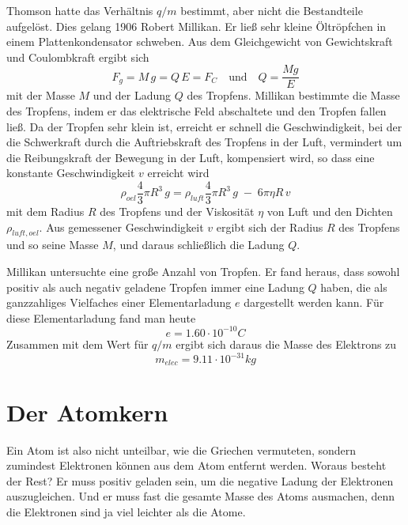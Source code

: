 Thomson hatte das Verhältnis $q/m$ bestimmt, aber nicht die Bestandteile aufgelöst. Dies gelang 1906 Robert Millikan. Er ließ sehr kleine Öltröpfchen in einem Plattenkondensator schweben. Aus dem Gleichgewicht von Gewichtskraft und Coulombkraft ergibt sich 
\begin{equation}
    F_g = M \, g = Q \, E = F_C \quad \text{und} \quad Q = \frac{M g}{E}
\end{equation}
mit der Masse $M$ und der Ladung $Q$ des Tropfens. Millikan bestimmte die Masse des Tropfens, indem er das elektrische Feld abschaltete und den Tropfen fallen ließ. Da der Tropfen sehr klein ist, erreicht er schnell die Geschwindigkeit, bei der die Schwerkraft durch die Auftriebskraft des Tropfens in der Luft, vermindert um die Reibungskraft der Bewegung in der Luft, kompensiert wird, so dass eine konstante Geschwindigkeit $v$ erreicht wird
\begin{equation}
    \rho_{oel} \frac{4}{3} \pi R^3 \, g  =  \rho_{luft} \frac{4}{3} \pi R^3 \, g
     \; - \; 6 
     \pi \eta R \, v 
 \end{equation}
mit dem Radius $R$ des Tropfens und der Viskosität $\eta$ von Luft und den Dichten $\rho_{luft, oel}$. Aus gemessener Geschwindigkeit $v$ ergibt sich  der Radius  $R$ des Tropfens und so seine Masse $M$, und daraus schließlich die Ladung $Q$.

Millikan untersuchte eine große Anzahl von Tropfen. Er fand heraus, dass sowohl positiv als auch negativ geladene Tropfen immer eine Ladung $Q$ haben, die als ganzzahliges Vielfaches einer Elementarladung $e$ dargestellt werden kann. Für diese Elementarladung fand man heute
\begin{equation}
    e = 1.60 \cdot 10^{-10} C  
\end{equation}
Zusammen mit dem Wert für $q/m$ ergibt sich daraus die Masse des Elektrons zu
\begin{equation}
    m_{elec} = 9.11 \cdot 10^{-31} kg  
\end{equation}


\section{Der Atomkern}

Ein Atom ist also nicht unteilbar, wie die Griechen vermuteten, sondern zumindest Elektronen können aus dem Atom entfernt werden. Woraus besteht der Rest? Er muss positiv geladen sein, um die negative Ladung der Elektronen auszugleichen. Und er muss fast die gesamte Masse des Atoms ausmachen, denn die Elektronen sind ja viel leichter als die Atome.

